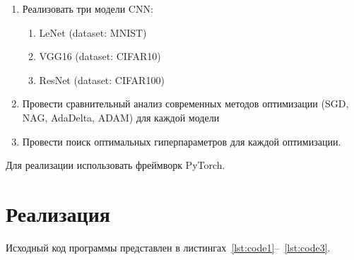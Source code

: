 \documentclass[a4paper, 14pt]{extarticle}
\begin{document}
\begin{enumerate}
    \item Реализовать три модели CNN:
        \begin{enumerate}
        \item LeNet (dataset: MNIST)
        \item VGG16 (dataset: CIFAR10)
        \item ResNet (dataset: CIFAR100)
        \end{enumerate}
    \item Провести сравнительный анализ современных методов
оптимизации (SGD, NAG, AdaDelta, ADAM) для каждой модели
    \item Провести поиск оптимальных гиперпараметров для каждой оптимизации.
\end{enumerate}

Для реализации использовать фреймворк PyTorch.

\section{Реализация}\label{Sect::realize}

Исходный код программы представлен в листингах~\ref{lst:code1}--~\ref{lst:code3}.
\end{document}
